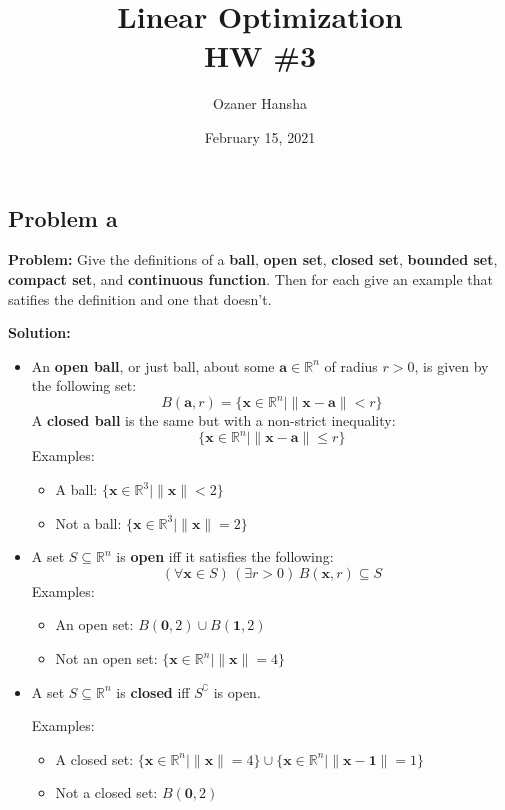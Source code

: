 \documentclass{article}
\renewcommand\vec{\mathbf}
\newcommand{\R}{\mathbb R}
\begin{document}
\title{Linear Optimization\\HW \#3}
\author{Ozaner Hansha}
\date{February 15, 2021}
\maketitle

\subsection*{Problem a}
\noindent\textbf{Problem:} Give the definitions of a \textbf{ball}, \textbf{open set}, \textbf{closed set}, \textbf{bounded set}, \textbf{compact set}, and \textbf{continuous function}. Then for each give an example that satifies the definition and one that doesn't.
\bigskip

\noindent\textbf{Solution:}
\begin{itemize}
    \item An \textbf{open ball}, or just ball, about some $\vec a\in\R^n$ of radius $r>0$, is given by the following set:
    $$B(\vec a, r)=\{\vec x\in\R^n\mid \|\vec x-\vec a\|<r\}$$
    A \textbf{closed ball} is the same but with a non-strict inequality:
    $$\{\vec x\in\R^n\mid \|\vec x-\vec a\|\le r\}$$
    Examples:
    \begin{itemize}[label = -]
        \item A ball: $\{\vec x\in\R^3\mid \|\vec x\|<2\}$
        \item Not a ball: $\{\vec x\in\R^3\mid \|\vec x\|=2\}$
    \end{itemize}

    \item A set $S\subseteq\R^n$ is \textbf{open} iff it satisfies the following:
    $$(\forall\vec x\in S)\,(\exists r>0)\, B(\vec x, r)\subseteq S$$
    Examples:
    \begin{itemize}[label = -]
        \item An open set: $B(\vec 0, 2)\cup B(\vec 1, 2)$
        \item Not an open set: $\{\vec x\in\R^n\mid \|\vec x\|=4\}$
    \end{itemize}

    \item A set $S\subseteq\R^n$ is \textbf{closed} iff $S^\complement$ is open.
    
    Examples:
    \begin{itemize}[label = -]
        \item A closed set: $\{\vec x\in\R^n\mid \|\vec x\|=4\}\cup\{\vec x\in\R^n\mid \|\vec x-\vec 1\|=1\}$
        \item Not a closed set: $B(\vec 0, 2)$
    \end{itemize}


\end{itemize}
\end{document}
